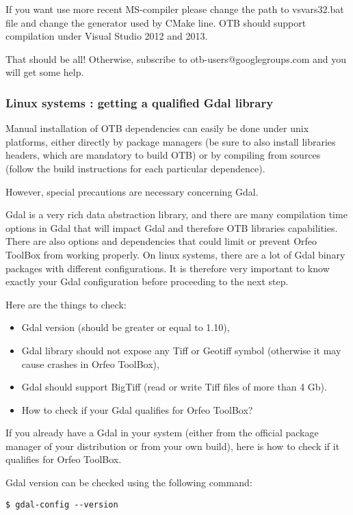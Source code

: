 If you want use more recent MS-compiler please change the path to vsvars32.bat file and change the generator used by CMake line. OTB should support compilation under Visual Studio 2012 and 2013. 

That should be all! Otherwise, subscribe to otb-users@googlegroups.com and you will get some help.



\subsubsection{Linux systems : getting a qualified Gdal library }
\label{sec:gdal}
Manual installation of OTB dependencies can easily be done under unix platforms, either directly by package managers (be sure to also install libraries headers, which are mandatory to build OTB) or by compiling from sources (follow the build instructions for each particular dependence).

However, special precautions are necessary concerning Gdal.
    
Gdal is a very rich data abstraction library, and there are many compilation time options in Gdal that will impact Gdal and therefore OTB libraries capabilities. There are also options and dependencies that could limit or prevent Orfeo ToolBox from working properly. On linux systems, there are a lot of Gdal binary packages with different configurations. It is therefore very important to know exactly your Gdal configuration before proceeding to the next step.

Here are the things to check:
\begin{itemize}
	\item Gdal version (should be greater or equal to 1.10),
	\item Gdal library should not expose any Tiff or Geotiff symbol (otherwise it may cause crashes in Orfeo ToolBox),
	\item Gdal should support BigTiff (read or write Tiff files of more than 4 Gb).
\end{itemize}

\begin{itemize}
	\item {How to check if your Gdal qualifies for Orfeo ToolBox?}
\end{itemize}
If you already have a Gdal in your system (either from the official package manager of your distribution or from your own build), here is how to check if it qualifies for Orfeo ToolBox.

Gdal version can be checked using the following command:
\begin{verbatim}
$ gdal-config --version
\end{verbatim}

